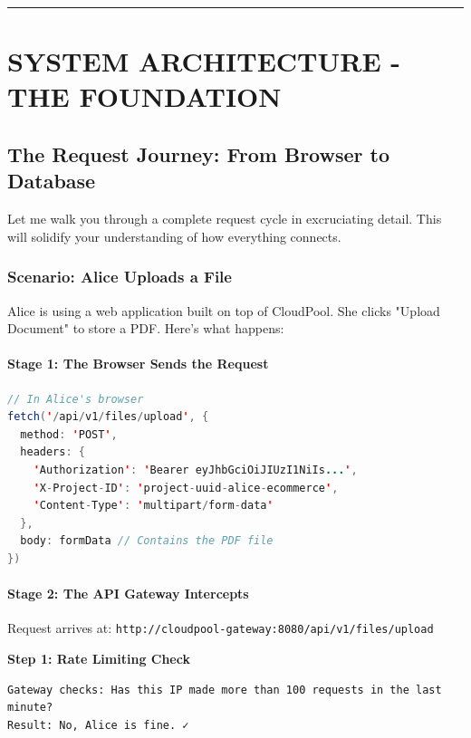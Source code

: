 \documentclass[11pt,a4paper]{report}
\begin{document}
\vfill\hrule\vfill



\part{SYSTEM ARCHITECTURE - THE FOUNDATION}



\chapter{The Request Journey: From Browser to Database}


Let me walk you through a complete request cycle in excruciating detail. This will solidify your understanding of how everything connects.


\section{Scenario: Alice Uploads a File}


Alice is using a web application built on top of CloudPool. She clicks "Upload Document" to store a PDF. Here's what happens:


\subsection{Stage 1: The Browser Sends the Request}


\begin{lstlisting}[language=Java]
// In Alice's browser
fetch('/api/v1/files/upload', {
  method: 'POST',
  headers: {
    'Authorization': 'Bearer eyJhbGciOiJIUzI1NiIs...',
    'X-Project-ID': 'project-uuid-alice-ecommerce',
    'Content-Type': 'multipart/form-data'
  },
  body: formData // Contains the PDF file
})
\end{lstlisting}


\subsection{Stage 2: The API Gateway Intercepts}


Request arrives at: \texttt{http://cloudpool-gateway:8080/api/v1/files/upload}

\textbf{Step 1: Rate Limiting Check}
\begin{lstlisting}[language=text]
Gateway checks: Has this IP made more than 100 requests in the last minute?
Result: No, Alice is fine. ✓
\end{lstlisting}
\end{document}
